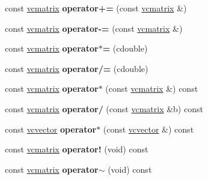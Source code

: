 \begin{DoxyCompactItemize}
\item 
const \hyperlink{classvcmatrix}{vcmatrix} {\bfseries operator+=} (const \hyperlink{classvcmatrix}{vcmatrix} \&)\hypertarget{classvcmatrix_a8ac7101b257836b9f2aeb4037f0ed503}{}\label{classvcmatrix_a8ac7101b257836b9f2aeb4037f0ed503}

\item 
const \hyperlink{classvcmatrix}{vcmatrix} {\bfseries operator-\/=} (const \hyperlink{classvcmatrix}{vcmatrix} \&)\hypertarget{classvcmatrix_a47eb04db3ca34b5125c36f37525c8b91}{}\label{classvcmatrix_a47eb04db3ca34b5125c36f37525c8b91}

\item 
const \hyperlink{classvcmatrix}{vcmatrix} {\bfseries operator$\ast$=} (cdouble)\hypertarget{classvcmatrix_a9be5b4a7982ab773398573bf907eb862}{}\label{classvcmatrix_a9be5b4a7982ab773398573bf907eb862}

\item 
const \hyperlink{classvcmatrix}{vcmatrix} {\bfseries operator/=} (cdouble)\hypertarget{classvcmatrix_ac430efe860493a15d2d729520b46c5a2}{}\label{classvcmatrix_ac430efe860493a15d2d729520b46c5a2}

\item 
const \hyperlink{classvcmatrix}{vcmatrix} {\bfseries operator$\ast$} (const \hyperlink{classvcmatrix}{vcmatrix} \&) const \hypertarget{classvcmatrix_a8a2b2821415404e8503e9ee6ed3e4ac4}{}\label{classvcmatrix_a8a2b2821415404e8503e9ee6ed3e4ac4}

\item 
const \hyperlink{classvcmatrix}{vcmatrix} {\bfseries operator/} (const \hyperlink{classvcmatrix}{vcmatrix} \&b) const \hypertarget{classvcmatrix_a1728ef244bbb2b3831262dc6879f1445}{}\label{classvcmatrix_a1728ef244bbb2b3831262dc6879f1445}

\item 
const \hyperlink{classvcvector}{vcvector} {\bfseries operator$\ast$} (const \hyperlink{classvcvector}{vcvector} \&) const \hypertarget{classvcmatrix_a88fe0d91a50b0010f70cc4e926d5e263}{}\label{classvcmatrix_a88fe0d91a50b0010f70cc4e926d5e263}

\item 
const \hyperlink{classvcmatrix}{vcmatrix} {\bfseries operator!} (void) const \hypertarget{classvcmatrix_a3faf977bf856a32b5acb3e47784cd5ed}{}\label{classvcmatrix_a3faf977bf856a32b5acb3e47784cd5ed}

\item 
const \hyperlink{classvcmatrix}{vcmatrix} {\bfseries operator$\sim$} (void) const \hypertarget{classvcmatrix_a67cacfc86c36bb4fdc3af85186a22968}{}\label{classvcmatrix_a67cacfc86c36bb4fdc3af85186a22968}


\end{DoxyCompactItemize}

